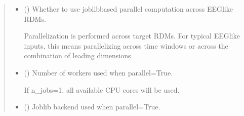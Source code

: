 \documentclass[letterpaper,10pt,english]{sphinxhowto}
\begin{document}
\begin{fulllineitems}
\begin{quote}
\begin{description}
\begin{itemize}
\sphinxAtStartPar
Supported shapes are:
\begin{itemize}
\item {} 
\sphinxAtStartPar
{[}n\_cons, n\_cons{]}

\item {} 
\sphinxAtStartPar
{[}n1, n\_cons, n\_cons{]}

\item {} 
\sphinxAtStartPar
{[}n1, n2, n\_cons, n\_cons{]}

\item {} 
\sphinxAtStartPar
{[}n1, n2, n3, n\_cons, n\_cons{]}

\end{itemize}

\sphinxAtStartPar
The leading dimensions can represent time windows, channels, subjects,
or other analysis dimensions.


\item {} 
\sphinxAtStartPar
{} (\sphinxstyleliteralemphasis{\sphinxupquote{, }}) \textendash{} 
\sphinxAtStartPar
Whether to use joblib\sphinxhyphen{}based parallel computation across EEG\sphinxhyphen{}like RDMs.

\sphinxAtStartPar
Parallelization is performed across target RDMs. For typical EEG\sphinxhyphen{}like
inputs, this means parallelizing across time windows or across the
combination of leading dimensions.


\item {} 
\sphinxAtStartPar
{} (\sphinxstyleliteralemphasis{\sphinxupquote{, }}) \textendash{} 
\sphinxAtStartPar
Number of workers used when parallel=True.

\sphinxAtStartPar
If n\_jobs=\sphinxhyphen{}1, all available CPU cores will be used.


\item {} 
\sphinxAtStartPar
{} (\sphinxstyleliteralemphasis{\sphinxupquote{, }}\sphinxstyleliteralemphasis{\sphinxupquote{, }}) \textendash{} Joblib backend used when parallel=True.


\end{itemize}
\end{description}
\end{quote}
\end{fulllineitems}
\end{document}
